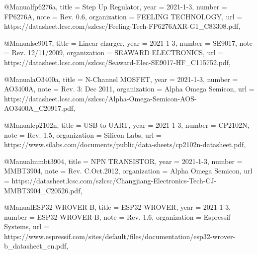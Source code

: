 @Manual{fp6276a,
    title        = {Step Up Regulator},
    year         = {2021-1-3},
    number       = {FP6276A},
    note         = {Rev. 0.6},
    organization = {FEELING TECHNOLOGY},
    url          = {https://datasheet.lcsc.com/szlcsc/Feeling-Tech-FP6276AXR-G1_C83308.pdf},
}

@Manual{se9017,
    title        = {Linear charger},
    year         = {2021-1-3},
    number       = {SE9017},
    note         = {Rev. 12/11/2009},
    organization = {SEAWARD ELECTRONICS},
    url          = {https://datasheet.lcsc.com/szlcsc/Seaward-Elec-SE9017-HF_C115752.pdf},
}

@Manual{aO3400a,
    title        = {N-Channel MOSFET},
    year         = {2021-1-3},
    number       = {AO3400A},
    note         = {Rev. 3: Dec 2011},
    organization = {Alpha Omega Semicon},
    url          = {https://datasheet.lcsc.com/szlcsc/Alpha-Omega-Semicon-AOS-AO3400A\-_C20917.pdf},
}

@Manual{cp2102n,
    title        = {USB to UART},
    year         = {2021-1-3},
    number       = {CP2102N},
    note         = {Rev. 1.5},
    organization = {Si\-li\-con Labs},
    url          = {https://www.si\-la\-bs\-.com/documents/public/data-sheets/cp2102n-datasheet.pdf},
}

@Manual{mmbt3904,
    title        = {NPN TRANSISTOR},
    year         = {2021-1-3},
    number       = {MMBT3904},
    note         = {Rev. C.Oct.2012},
    organization = {Alpha Omega Semicon},
    url          = {https://datasheet.lcsc.com/szlcsc/Changjiang-Electronics-Tech-CJ-MMBT3904_C20526.pdf},
}

@Manual{ESP32-WROVER-B,
    title        = {ESP32-WROVER},
    year         = {2021-1-3},
    number       = {ESP32-WROVER-B},
    note         = {Rev.  1.6},
    organization = {Espressif Systems},
    url          = {https://www.espressif.com/sites/default/files/documentation/\-esp32-wrover-b_datasheet_en.pdf},
}

